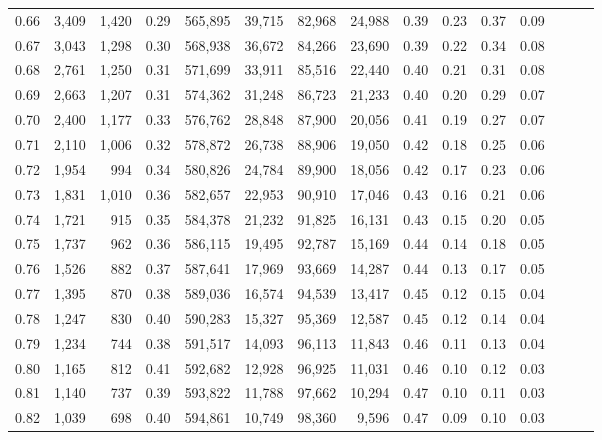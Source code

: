 \begin{tabular}{rrrrrrrrrrrrrrr}
0.66 &   3,409 &  1,420 &  0.29 &  565,895 &   39,715 &   82,968 &   24,988 &  0.39 &  0.23 &  0.37 &      0.09 \\
0.67 &   3,043 &  1,298 &  0.30 &  568,938 &   36,672 &   84,266 &   23,690 &  0.39 &  0.22 &  0.34 &      0.08 \\
0.68 &   2,761 &  1,250 &  0.31 &  571,699 &   33,911 &   85,516 &   22,440 &  0.40 &  0.21 &  0.31 &      0.08 \\
0.69 &   2,663 &  1,207 &  0.31 &  574,362 &   31,248 &   86,723 &   21,233 &  0.40 &  0.20 &  0.29 &      0.07 \\
0.70 &   2,400 &  1,177 &  0.33 &  576,762 &   28,848 &   87,900 &   20,056 &  0.41 &  0.19 &  0.27 &      0.07 \\
0.71 &   2,110 &  1,006 &  0.32 &  578,872 &   26,738 &   88,906 &   19,050 &  0.42 &  0.18 &  0.25 &      0.06 \\
0.72 &   1,954 &    994 &  0.34 &  580,826 &   24,784 &   89,900 &   18,056 &  0.42 &  0.17 &  0.23 &      0.06 \\
0.73 &   1,831 &  1,010 &  0.36 &  582,657 &   22,953 &   90,910 &   17,046 &  0.43 &  0.16 &  0.21 &      0.06 \\
0.74 &   1,721 &    915 &  0.35 &  584,378 &   21,232 &   91,825 &   16,131 &  0.43 &  0.15 &  0.20 &      0.05 \\
0.75 &   1,737 &    962 &  0.36 &  586,115 &   19,495 &   92,787 &   15,169 &  0.44 &  0.14 &  0.18 &      0.05 \\
0.76 &   1,526 &    882 &  0.37 &  587,641 &   17,969 &   93,669 &   14,287 &  0.44 &  0.13 &  0.17 &      0.05 \\
0.77 &   1,395 &    870 &  0.38 &  589,036 &   16,574 &   94,539 &   13,417 &  0.45 &  0.12 &  0.15 &      0.04 \\
0.78 &   1,247 &    830 &  0.40 &  590,283 &   15,327 &   95,369 &   12,587 &  0.45 &  0.12 &  0.14 &      0.04 \\
0.79 &   1,234 &    744 &  0.38 &  591,517 &   14,093 &   96,113 &   11,843 &  0.46 &  0.11 &  0.13 &      0.04 \\
0.80 &   1,165 &    812 &  0.41 &  592,682 &   12,928 &   96,925 &   11,031 &  0.46 &  0.10 &  0.12 &      0.03 \\
0.81 &   1,140 &    737 &  0.39 &  593,822 &   11,788 &   97,662 &   10,294 &  0.47 &  0.10 &  0.11 &      0.03 \\
0.82 &   1,039 &    698 &  0.40 &  594,861 &   10,749 &   98,360 &    9,596 &  0.47 &  0.09 &  0.10 &      0.03 \\

\end{tabular}
